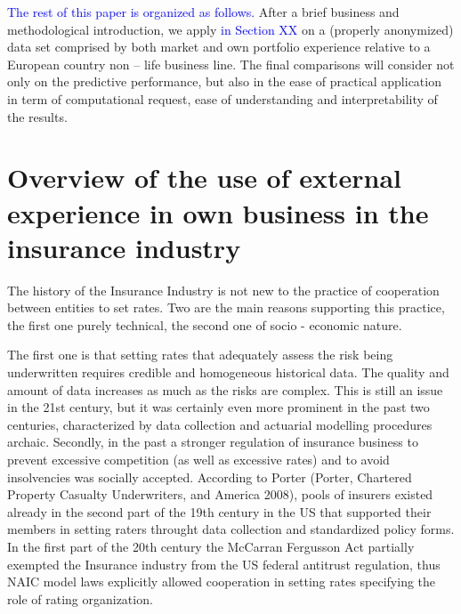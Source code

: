 \documentclass[
]{article}
\begin{document}
\textcolor{blue}{The rest of this paper is organized as follows.} After
a brief business and methodological introduction, we apply
\textcolor{blue}{in Section XX} on a (properly anonymized) data set
comprised by both market and own portfolio experience relative to a
European country non -- life business line. The final comparisons will
consider not only on the predictive performance, but also in the ease of
practical application in term of computational request, ease of
understanding and interpretability of the results.

\hypertarget{overview-of-the-use-of-external-experience-in-own-business-in-the-insurance-industry}{%
\section{Overview of the use of external experience in own business in
the insurance
industry}\label{overview-of-the-use-of-external-experience-in-own-business-in-the-insurance-industry}}

The history of the Insurance Industry is not new to the practice of
cooperation between entities to set rates. Two are the main reasons
supporting this practice, the first one purely technical, the second one
of socio - economic nature.

The first one is that setting rates that adequately assess the risk
being underwritten requires credible and homogeneous historical data.
The quality and amount of data increases as much as the risks are
complex. This is still an issue in the 21st century, but it was
certainly even more prominent in the past two centuries, characterized
by data collection and actuarial modelling procedures archaic. Secondly,
in the past a stronger regulation of insurance business to prevent
excessive competition (as well as excessive rates) and to avoid
insolvencies was socially accepted. According to Porter (Porter,
Chartered Property Casualty Underwriters, and America 2008), pools of
insurers existed already in the second part of the 19th century in the
US that supported their members in setting raters throught data
collection and standardized policy forms. In the first part of the 20th
century the McCarran Fergusson Act partially exempted the Insurance
industry from the US federal antitrust regulation, thus NAIC model laws
explicitly allowed cooperation in setting rates specifying the role of
rating organization.
\end{document}
